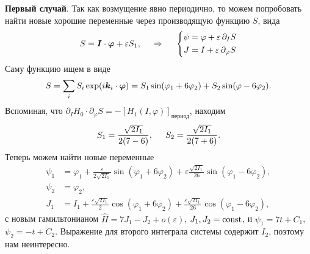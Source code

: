 \textbf{Первый случай}. Так как возмущение явно периодично, то можем попробовать найти новые хорошие переменные через производящую функцию $S$, вида
\begin{equation*}
    S = \mbox{\boldmath $I$} \cdot \mbox{\boldmath $\varphi$} + \varepsilon S_1,
    \hspace{0.5cm} \Rightarrow \hspace{0.5cm}
    \left\{\begin{aligned}
        \psi &= \varphi + \varepsilon\, \partial_I S \\
        J &= I + \varepsilon\, \partial_\varphi S
    \end{aligned}\right.
\end{equation*}
Саму функцию ищем в виде
\begin{equation*}
    S = \sum_i S_i \exp(i \mbox{\boldmath $k$}_i \cdot \mbox{\boldmath $\varphi$}) = S_1 \sin(\varphi_1 + 6 \varphi_2) + S_2 \sin (\varphi - 6 \varphi_2).
\end{equation*}
Вспоминая, что $\partial_I H_0 \cdot \partial_\varphi S = -\left[H_1(I, \varphi)\right]_{\text{период}}$, находим
\begin{equation*}
    S_1 = \frac{\sqrt{2 I_1}}{2 (7-6)}, \hspace{5 mm} 
    S_2 = \frac{\sqrt{2 I_1}}{2 (7+6)}.
\end{equation*}
Теперь можем найти новые переменные
\begin{align*}
    \psi_1 &= \varphi_1 + \frac{\varepsilon}{2 \sqrt{2 I_1}} \sin(\varphi_1 + 6 \varphi_2) + \varepsilon \frac{\sqrt{2 I_1}}{26} \sin(\varphi_1 - 6 \varphi_2),\\
    \psi_2 &= \varphi_2, \\
    J_1 &= I_1 + \frac{\varepsilon \sqrt{2 I_1}}{2} \cos(\varphi_1 + 6 \varphi_2) + \frac{\varepsilon \sqrt{2 I_1}}{26} \cos(\varphi_1 - 6 \varphi_2), 
\end{align*}
с новым гамильтонианом $\hat{H} = 7 J_1 - J_2 + o(\varepsilon)$, $J_1, J_2 = \text{const}$, и $\psi_1 = 7 t + C_1$, $\psi_2 = - t + C_2$. Выражение для второго интеграла системы содержит $I_2$, поэтому нам неинтересно.

